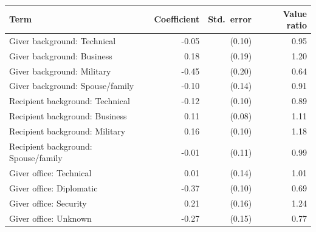 \begin{tabular}{lrrr}
\toprule
Term & Coefficient & Std.\ error & Value ratio \\
\midrule
Giver background: Technical & -0.05 & (0.10) & 0.95 \\
Giver background: Business & 0.18 & (0.19) & 1.20 \\
Giver background: Military & -0.45 & (0.20) & 0.64 \\
Giver background: Spouse/family & -0.10 & (0.14) & 0.91 \\
Recipient background: Technical & -0.12 & (0.10) & 0.89 \\
Recipient background: Business & 0.11 & (0.08) & 1.11 \\
Recipient background: Military & 0.16 & (0.10) & 1.18 \\
Recipient background: Spouse/family & -0.01 & (0.11) & 0.99 \\
Giver office: Technical & 0.01 & (0.14) & 1.01 \\
Giver office: Diplomatic & -0.37 & (0.10) & 0.69 \\
Giver office: Security & 0.21 & (0.16) & 1.24 \\
Giver office: Unknown & -0.27 & (0.15) & 0.77 \\
\bottomrule
\end{tabular}
